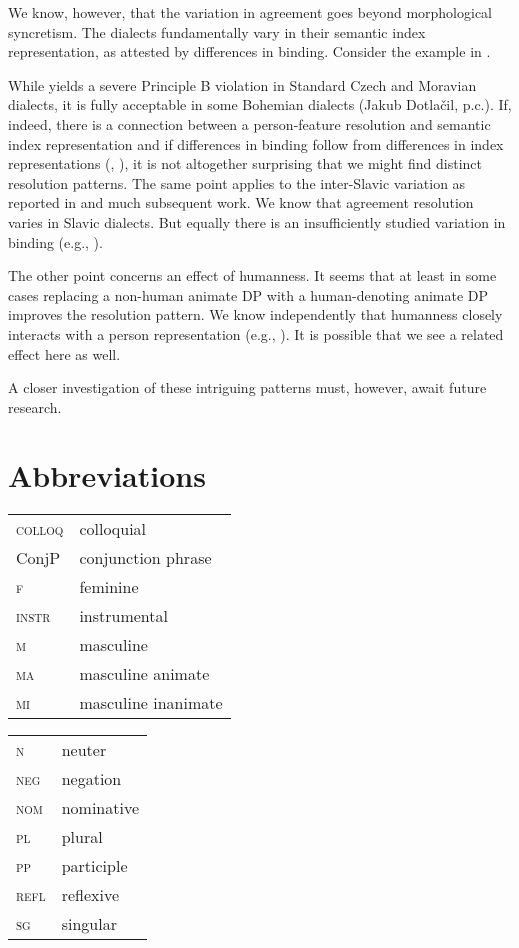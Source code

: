 \documentclass[output=paper,
modfonts
newtxmath,
hidelinks
]{langscibook}
\begin{document}
We know, however, that the variation in agreement goes beyond morphological syncretism. The dialects fundamentally vary in their semantic index representation, as attested by differences in binding. Consider the example in .

\z

\noindent While  yields a severe Principle B violation in Standard Czech and Moravian dialects, it is fully acceptable in some Bohemian dialects (Jakub Dotlačil, p.c.). If, indeed, there is a connection between a person-feature resolution and semantic index representation and if differences in binding follow from differences in index representations (\citealt{Heim1998}, \citealt{Roelofsen2008}), it is not altogether surprising that we might find distinct resolution patterns. The same point applies to the inter-Slavic variation as reported in \citet{corbett83} and much subsequent work. We know that agreement resolution varies in Slavic dialects. But equally there is an insufficiently studied variation in binding (e.g., \citealt{Nikolaeva2014}). 

The other point concerns an effect of humanness. It seems that at least in some cases replacing  a non-human animate DP with a human-denoting animate DP improves the resolution pattern. We know independently that humanness closely interacts with a person representation (e.g., \citealt{Ritter2014, Wiltschko2015}). It is possible that we see a related effect here as well.

A closer investigation of these intriguing patterns must, however, await future research.


\section*{Abbreviations}

\begin{tabularx}{.45\textwidth}{lX}
\textsc{colloq}&colloquial\\
ConjP&conjunction phrase\\
\textsc{f}&feminine\\
\textsc{instr}&instrumental\\
\textsc{m}&masculine\\
\textsc{ma}&masculine animate\\
\textsc{mi}&masculine inanimate\\
\end{tabularx}
\begin{tabularx}{.45\textwidth}{lX}
\textsc{n}&neuter\\
\textsc{neg}&negation\\
\textsc{nom}&nominative\\
\textsc{pl}&plural\\
\textsc{pp}&participle\\
\textsc{refl}&reflexive\\
\textsc{sg}&singular\\
\end{tabularx}
\end{document}
